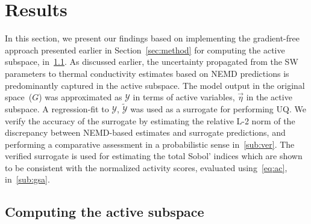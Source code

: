 \section{Results}
\label{sec:results}

In this section, we present our findings based on implementing the gradient-free approach presented
earlier in Section~\ref{sec:method} for computing the active subspace, in~\ref{sub:cas}. As discussed earlier,
the uncertainty propagated from the SW parameters to thermal conductivity estimates based on NEMD
predictions is predominantly captured in the active subspace. The model output in the original space~($G$)
was approximated as $\mathcal{Y}$ in terms of active variables, $\vec\eta$ in the active subspace. A regression-fit
to $\mathcal{Y}$, $\tilde{\mathcal{Y}}$ was used as a surrogate for performing UQ. 
We verify the accuracy of the surrogate by 
estimating the relative L-2 norm of the discrepancy between NEMD-based estimates and surrogate predictions,
and performing a comparative assessment in a probabilistic sense in~\ref{sub:ver}. The verified surrogate is
used for estimating the total Sobol' indices which are shown to be consistent with the normalized activity scores,
evaluated using~\eqref{eq:ac}, in~\ref{sub:gsa}.

\subsection{Computing the active subspace}
\label{sub:cas}

